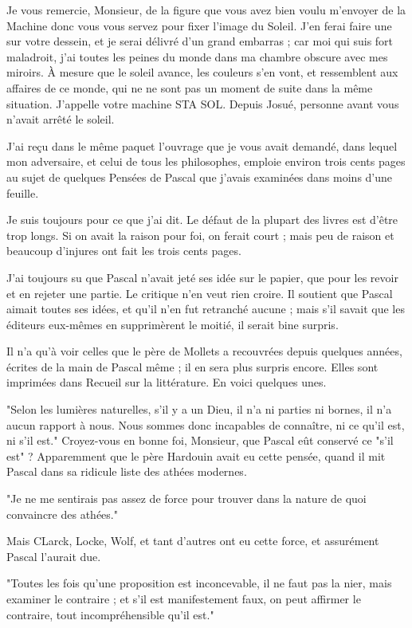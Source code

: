 \documentclass[french,twoside]{book} %
\begin{document}
\noindent Je vous remercie, Monsieur, de la figure que vous avez bien voulu m’envoyer de la Machine donc vous vous servez pour fixer l’image du Soleil. J’en ferai faire une sur votre dessein, et je serai délivré d’un grand embarras ; car moi qui suis fort maladroit, j’ai toutes les peines du monde dans ma chambre obscure avec mes miroirs. À mesure que le soleil avance, les couleurs s’en vont, et ressemblent aux affaires de ce monde, qui ne ne sont pas un moment de suite dans la même situation. J’appelle votre machine STA SOL. Depuis Josué, personne avant vous n’avait arrêté le soleil.\par
J’ai reçu dans le même paquet l’ouvrage que je vous avait demandé, dans lequel mon adversaire, et celui de tous les philosophes, emploie environ trois cents pages au sujet de quelques Pensées de Pascal que j’avais examinées dans moins d’une feuille.\par
Je suis toujours pour ce que j’ai dit. Le défaut de la plupart des livres est d’être trop longs. Si on avait la raison pour foi, on ferait court ; mais peu de raison et beaucoup d’injures ont fait les trois cents pages.\par
J’ai toujours su que Pascal n’avait jeté ses idée sur le papier, que pour les revoir et en rejeter une partie. Le critique n’en veut rien croire. Il soutient que Pascal aimait toutes ses idées, et qu’il n’en fut retranché aucune ; mais s’il savait que les éditeurs eux-mêmes en supprimèrent le moitié, il serait bine surpris.\par
Il n’a qu’à voir celles que le père de Mollets a recouvrées depuis quelques années, écrites de la main de Pascal même ; il en sera plus surpris encore. Elles sont imprimées dans Recueil sur la littérature. En voici quelques unes.\par
 "Selon les lumières naturelles, s’il y a un Dieu, il n’a ni parties ni bornes, il n’a aucun rapport à nous. Nous sommes donc incapables de connaître, ni ce qu’il est, ni s’il est." Croyez-vous en bonne foi, Monsieur, que Pascal eût conservé ce "s’il est" ? Apparemment que le père Hardouin avait eu cette pensée, quand il mit Pascal dans sa ridicule liste des athées modernes.\par
"Je ne me sentirais pas assez de force pour trouver dans la nature de quoi convaincre des athées."\par
Mais CLarck, Locke, Wolf, et tant d’autres ont eu cette force, et assurément Pascal l’aurait due. \par
"Toutes les fois qu’une proposition est inconcevable, il ne faut pas la nier, mais examiner le contraire ; et s’il est manifestement faux, on peut affirmer le contraire, tout incompréhensible qu’il est."\par
\end{document}
